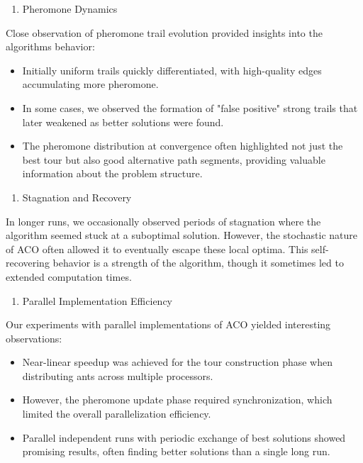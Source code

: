 \documentclass[
]{article}
\begin{document}
\begin{enumerate}
\def\labelenumi{\arabic{enumi}.}
\setcounter{enumi}{5}
\item
  Pheromone Dynamics
\end{enumerate}

Close observation of pheromone trail evolution provided insights into
the algorithm\textquotesingle s behavior:

\begin{itemize}
\item
  Initially uniform trails quickly differentiated, with high-quality
  edges accumulating more pheromone.
\item
  In some cases, we observed the formation of "false positive" strong
  trails that later weakened as better solutions were found.
\item
  The pheromone distribution at convergence often highlighted not just
  the best tour but also good alternative path segments, providing
  valuable information about the problem structure.
\end{itemize}

\begin{enumerate}
\def\labelenumi{\arabic{enumi}.}
\setcounter{enumi}{6}
\item
  Stagnation and Recovery
\end{enumerate}

In longer runs, we occasionally observed periods of stagnation where the
algorithm seemed stuck at a suboptimal solution. However, the stochastic
nature of ACO often allowed it to eventually escape these local optima.
This self-recovering behavior is a strength of the algorithm, though it
sometimes led to extended computation times.

\begin{enumerate}
\def\labelenumi{\arabic{enumi}.}
\setcounter{enumi}{7}
\item
  Parallel Implementation Efficiency
\end{enumerate}

Our experiments with parallel implementations of ACO yielded interesting
observations:

\begin{itemize}
\item
  Near-linear speedup was achieved for the tour construction phase when
  distributing ants across multiple processors.
\item
  However, the pheromone update phase required synchronization, which
  limited the overall parallelization efficiency.
\item
  Parallel independent runs with periodic exchange of best solutions
  showed promising results, often finding better solutions than a single
  long run.
\end{itemize}
\end{document}
